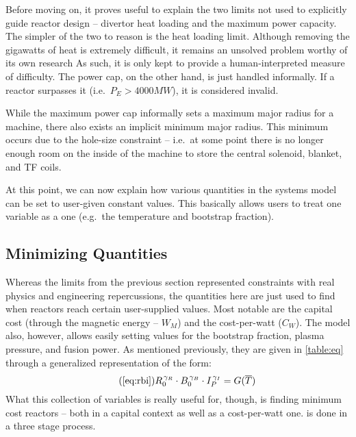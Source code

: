 Before moving on, it proves useful to explain the two limits not used to explicitly guide reactor design -- divertor heat loading and the maximum power capacity. The simpler of the two to reason is the heat loading limit. Although removing the gigawatts of heat is extremely difficult, it remains an unsolved problem worthy of its own research  As such, it is only kept to provide a human-interpreted  measure of difficulty. The power cap, on the other hand, is just handled informally. If a reactor surpasses it (i.e.\ $ P_E > 4000 MW $), it is considered invalid.

While the maximum power cap informally sets a maximum major radius for a machine, there also exists an implicit minimum major radius. This minimum occurs due to the hole-size constraint -- i.e.\ at some point there is no longer enough room on the inside of the machine to store the central solenoid, blanket, and TF coils.

At this point, we can now explain how various quantities in the systems model can be set to user-given constant values. This basically allows users to treat one  variable as a  one (e.g.\ the temperature and bootstrap fraction).

\subsection{Minimizing  Quantities} 

Whereas the limits from the previous section represented constraints with real physics and engineering repercussions, the  quantities here are just used to find when reactors reach certain user-supplied values. Most notable are the capital cost (through the magnetic energy -- $W_M$) and the cost-per-watt ($C_W$). The model also, however, allows easily setting values for the bootstrap fraction, plasma pressure, and fusion power. As mentioned previously, they are given in \cref{table:eq} through a generalized representation of the form:
\begin{equation}
	\tag{\ref{eq:rbi}}
	R_0^{\, \gamma_R} \cdot B_0^{\, \gamma_B} \cdot I_P^{\, \gamma_I} = G( \overline T )
\end{equation}
What this collection of variables is really useful for, though, is finding minimum cost reactors -- both in a capital context as well as a cost-per-watt one.  is done in a three stage process. 

